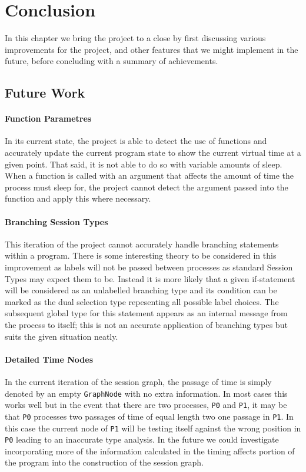 \documentclass[11pt, abstracton, twoside, titlepage=true]{scrartcl}
\begin{document}
\newpage

\section{Conclusion}
\thispagestyle{empty}
In this chapter we bring the project to a close by first discussing various 
improvements for the project, and other features that we might implement 
in the future, before concluding with a summary of achievements. 

\subsection{Future Work}
\paragraph{Function Parametres}
In its current state, the project is able to detect the use of functions
and accurately update the current program state to show the current virtual
time at a given point. That said, it is not able to do so with variable
amounts of sleep. When a function is called with an argument that affects the
amount of time the process must sleep for, the project cannot detect the
argument passed into the function and apply this where necessary.

\paragraph{Branching Session Types}
This iteration of the project cannot accurately handle branching statements 
within a program. There is some interesting theory to be considered in this
improvement as labels will not be passed between processes as standard Session
Types may expect them to be. Instead it is more likely that a given if-statement
will be considered as an unlabelled branching type and its condition
can be marked as the dual selection type repesenting all possible label choices.
The subsequent global type for this statement appears as an internal message
from the process to itself; this is not an accurate application of branching
types but suits the given situation neatly.

\paragraph{Detailed Time Nodes}
In the current iteration of the session graph, the passage of time is simply
denoted by an empty \texttt{GraphNode} with no extra information. In most cases
this works well but in the event that there are two processes, \texttt{P0} and
\texttt{P1}, it may be that \texttt{P0} processes two passages of time of equal
length two one passage in \texttt{P1}. In this case the current node of 
\texttt{P1} will be testing itself against the wrong position in \texttt{P0} 
leading to an inaccurate type analysis. In the future we could investigate
incorporating more of the information calculated in the timing affects portion
of the program into the construction of the session graph.
\end{document}
